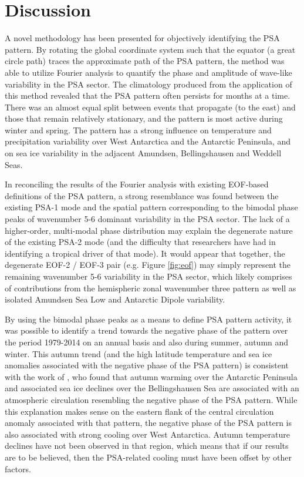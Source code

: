 \section{Discussion}

A novel methodology has been presented for objectively identifying the PSA pattern. By rotating the global coordinate system such that the equator (a great circle path) traces the approximate path of the PSA pattern, the method was able to utilize Fourier analysis to quantify the phase and amplitude of wave-like variability in the PSA sector. The climatology produced from the application of this method revealed that the PSA pattern often persists for months at a time. There was an almost equal split between events that propagate (to the east) and those that remain relatively stationary, and the pattern is most active during winter and spring. The pattern has a strong influence on temperature and precipitation variability over West Antarctica and the Antarctic Peninsula, and on sea ice variability in the adjacent Amundsen, Bellingshausen and Weddell Seas. 

In reconciling the results of the Fourier analysis with existing EOF-based definitions of the PSA pattern, a strong resemblance was found between the existing PSA-1 mode and the spatial pattern corresponding to the bimodal phase peaks of wavenumber 5-6 dominant variability in the PSA sector. The lack of a higher-order, multi-modal phase distribution may explain the degenerate nature of the existing PSA-2 mode (and the difficulty that researchers have had in identifying a tropical driver of that mode). It would appear that together, the degenerate EOF-2 / EOF-3 pair (e.g. Figure \ref{fig:eof}) may simply represent the remaining wavenumber 5-6 variability in the PSA sector, which likely comprises of contributions from the hemispheric zonal wavenumber three pattern as well as isolated Amundsen Sea Low and Antarctic Dipole variability.    

By using the bimodal phase peaks as a means to define PSA pattern activity, it was possible to identify a trend towards the negative phase of the pattern over the period 1979-2014 on an annual basis and also during summer, autumn and winter. This autumn trend (and the high latitude temperature and sea ice anomalies associated with the negative phase of the PSA pattern) is consistent with the work of \citet{Ding2013}, who found that autumn warming over the Antarctic Peninsula and associated sea ice declines over the Bellingshausen Sea are associated with an atmospheric circulation resembling the negative phase of the PSA pattern. While this explanation makes sense on the eastern flank of the central circulation anomaly associated with that pattern, the negative phase of the PSA pattern is also associated with strong cooling over West Antarctica. Autumn temperature declines have not been observed in that region, which means that if our results are to be believed, then the PSA-related cooling must have been offset by other factors. 

